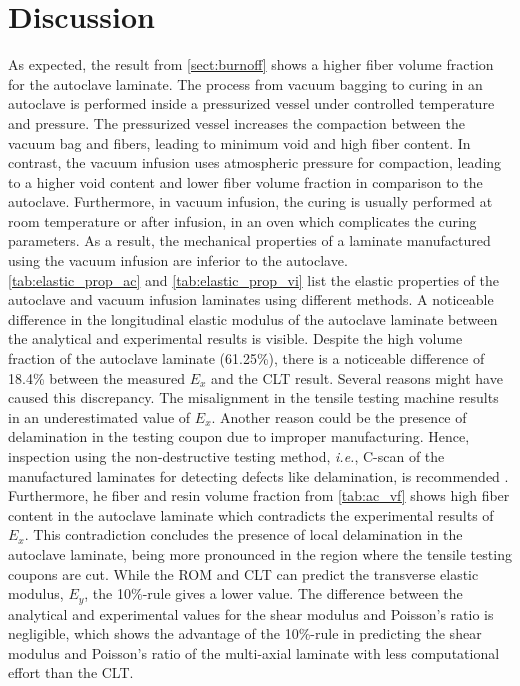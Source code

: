 \documentclass{article}
\begin{document}
\section{Discussion}\label{sec:discussion}
As expected, the result from \cref{sect:burnoff} shows a higher fiber volume fraction for the autoclave laminate. The process from vacuum bagging to curing in an autoclave is performed inside a pressurized vessel under controlled temperature and pressure. The pressurized vessel increases the compaction between the vacuum bag and fibers, leading to minimum void and high fiber content. In contrast, the vacuum infusion uses atmospheric pressure for compaction, leading to a higher void content and lower fiber volume fraction in comparison to the autoclave. Furthermore, in vacuum infusion, the curing is usually performed at room temperature or after infusion, in an oven which complicates the curing parameters. As a result, the mechanical properties of a laminate manufactured using the vacuum infusion are inferior to the autoclave. \\

\cref{tab:elastic_prop_ac} and \cref{tab:elastic_prop_vi} list the elastic properties of the autoclave and vacuum infusion laminates using different methods. A noticeable difference in the longitudinal elastic modulus of the autoclave laminate between the analytical and experimental results is visible. Despite the high volume fraction of the autoclave laminate (61.25\%), there is a noticeable difference of 18.4\% between the measured $E_{x}$ and the CLT result. Several reasons might have caused this discrepancy. The misalignment in the tensile testing machine results in an underestimated value of $E_{x}$. Another reason could be the presence of delamination in the testing coupon due to improper manufacturing. Hence, inspection using the non-destructive testing method, \emph{i.e.}, C-scan of the manufactured laminates for detecting defects like delamination, is recommended \cite{Imielinska2004}. Furthermore, he fiber and resin volume fraction from \cref{tab:ac_vf} shows high fiber content in the autoclave laminate which contradicts the experimental results of $E_x$. This contradiction concludes the presence of local delamination in the autoclave laminate, being more pronounced in the region where the tensile testing coupons are cut. While the ROM and CLT can predict the transverse elastic modulus, $E_y$, the 10\%-rule gives a lower value. The difference between the analytical and experimental values for the shear modulus and Poisson's ratio is negligible, which shows the advantage of the 10\%-rule in predicting the shear modulus and Poisson's ratio of the multi-axial laminate with less computational effort than the CLT. \\
\end{document}
